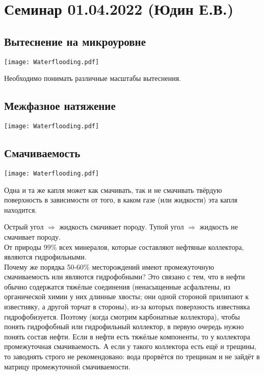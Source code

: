 \documentclass[main.tex]{subfiles}
\begin{document}
\section{Семинар 01.04.2022 (Юдин Е.В.)}

\subsection{Вытеснение на микроуровне}

\texttt{[image: Waterflooding.pdf]}

Необходимо понимать различные масштабы вытеснения.


\subsection{Межфазное натяжение}

\texttt{[image: Waterflooding.pdf]}

\subsection{Смачиваемость}

\texttt{[image: Waterflooding.pdf]}

Одна и та же капля может как смачивать, так и не смачивать твёрдую поверхность в зависимости от того, в каком газе (или жидкости) эта капля находится.


Острый угол $\Rightarrow$ жидкость смачивает породу. Тупой угол $\Rightarrow$ жидкость не смачивает породу.\\

От природы 99\% всех минералов, которые составляют нефтяные коллектора, являются гидрофильными.\\

Почему же порядка 50-60\% месторождений имеют промежуточную смачиваемость или являются гидрофобными? Это связано с тем, что в нефти обычно содержатся тяжёлые соединения (ненасыщенные асфальтены, из органической химии у них длинные хвосты; они одной стороной прилипают к известняку, а другой торчат в стороны), из-за которых поверхность известняка гидрофобизуется.
Поэтому (когда смотрим карбонатные коллектора), чтобы понять гидрофобный или гидрофильный коллектор, в первую очередь нужно понять состав нефти. Если в нефти есть тяжёлые компоненты, то у коллектора промежуточная смачиваемость.
А если у такого коллектора есть ещё и трещины, то заводнять строго не рекомендовано: вода прорвётся по трещинам и не зайдёт в матрицу промежуточной смачиваемости.
\end{document}
